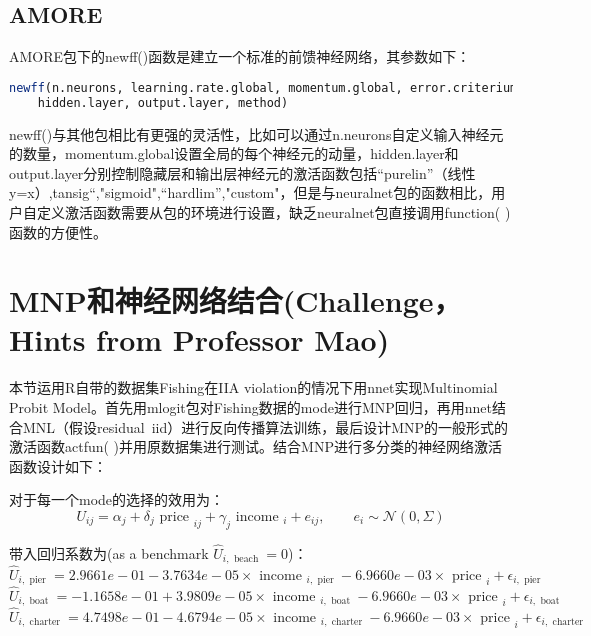 \documentclass[cn]{elegantpaper}
\begin{document}
\subsection{AMORE}
AMORE包下的newff()函数是建立一个标准的前馈神经网络，其参数如下：
\bigbreak
{\setmonofont{Lucida Console} 
\begin{lstlisting}[language=R]
newff(n.neurons, learning.rate.global, momentum.global, error.criterium, Stao, 
	hidden.layer, output.layer, method) 
\end{lstlisting}}
\bigbreak
newff()与其他包相比有更强的灵活性，比如可以通过n.neurons自定义输入神经元的数量，momentum.global设置全局的每个神经元的动量，hidden.layer和output.layer分别控制隐藏层和输出层神经元的激活函数包括“purelin”（线性y=x）,tansig“,"sigmoid",“hardlim”,"custom"，但是与neuralnet包的函数相比，用户自定义激活函数需要从包的环境进行设置，缺乏neuralnet包直接调用function( )函数的方便性。



\section{MNP和神经网络结合(Challenge，Hints from Professor Mao)}
本节运用R自带的数据集Fishing在IIA violation的情况下用nnet实现Multinomial Probit Model。首先用mlogit包对Fishing数据的mode进行MNP回归，再用nnet结合MNL（假设residual~iid）进行反向传播算法训练，最后设计MNP的一般形式的激活函数actfun( )并用原数据集进行测试。结合MNP进行多分类的神经网络激活函数设计如下：

对于每一个mode的选择的效用为：
\begin{equation}
U_{i j}=\alpha_{j}+\delta_{j} \text { price }_{i j}+\gamma_{j} \text { income }_{i}+e_{i j},\quad\quad e_{i} \sim \mathcal{N}(0, \Sigma)
\end{equation}

带入回归系数为(as a benchmark $\widehat{U}_{i, \text { beach }}=0 $)：
$$
\widehat{U}_{i, \text { pier }}=2.9661e-01-3.7634e-05 \times \text { income }_{i, \text { pier }}-6.9660e-03\times \text { price }_{i}+\epsilon_{i, \text { pier }}
$$
$$
\widehat{U}_{i, \text { boat }}=-1.1658e-01+3.9809e-05 \times \text { income }_{i, \text { boat }}-6.9660e-03\times \text { price }_{i}+\epsilon_{i, \text { boat }}
$$
$$
\widehat{U}_{i, \text { charter }}=4.7498e-01 - 4.6794e-05\times \text { income }_{i, \text { charter }}-6.9660e-03\times \text { price }_{i}+\epsilon_{i, \text { charter }}
$$
\end{document}
